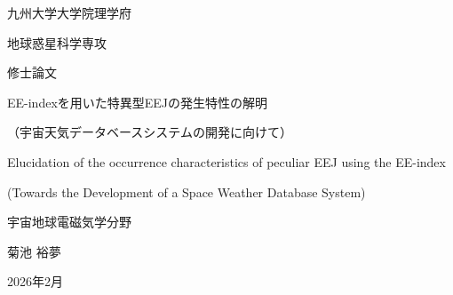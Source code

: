 \begin{titlepage}
    \begin{center}

        {\huge 九州大学大学院理学府 \par}
        {\huge 地球惑星科学専攻 \par}
        {\huge 修士論文 \par}
        
        \vspace{2cm}
        
        {\Huge EE-indexを用いた特異型EEJの発生特性の解明 \par}
        \vspace{0.5cm}
        {\Large （宇宙天気データベースシステムの開発に向けて） \par}
        
        \vspace{3cm}
        
        {\LARGE Elucidation of the occurrence characteristics of peculiar EEJ using the EE-index \par}
        \vspace{0.5cm}
        {\large (Towards the Development of a Space Weather Database System) \par}

        \vspace{4cm}
        
        {\LARGE 宇宙地球電磁気学分野 \par}
        
        \vspace{1cm}
        
        {\Large 菊池 裕夢 \par}        
        {\Large 2026年2月 \par}        

        \vspace{3cm}

        
    \end{center}
\end{titlepage}
